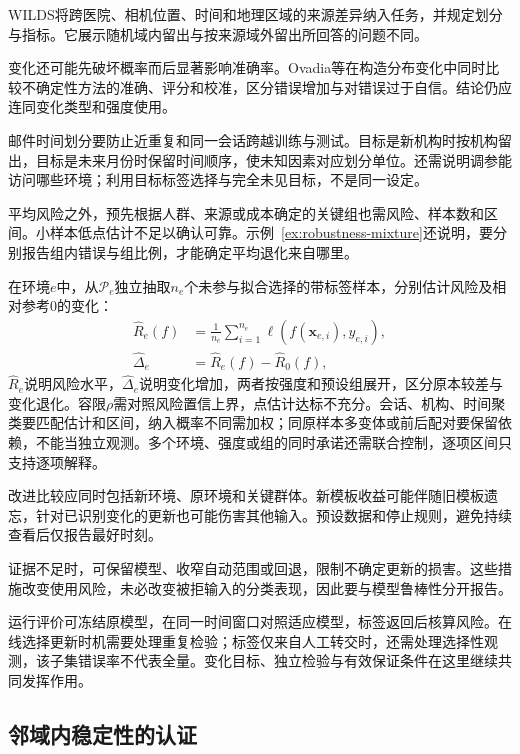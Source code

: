 WILDS将跨医院、相机位置、时间和地理区域的来源差异纳入任务，并规定划分与指标。它展示随机域内留出与按来源域外留出所回答的问题不同。

\Needspace{45mm}
变化还可能先破坏概率而后显著影响准确率。Ovadia等在构造分布变化中同时比较不确定性方法的准确、评分和校准，区分错误增加与对错误过于自信。结论仍应连同变化类型和强度使用。

邮件时间划分要防止近重复和同一会话跨越训练与测试。目标是新机构时按机构留出，目标是未来月份时保留时间顺序，使未知因素对应划分单位。还需说明调参能访问哪些环境；利用目标标签选择与完全未见目标，不是同一设定。

平均风险之外，预先根据人群、来源或成本确定的关键组也需风险、样本数和区间。小样本低点估计不足以确认可靠。示例~\ref{ex:robustness-mixture}还说明，要分别报告组内错误与组比例，才能确定平均退化来自哪里。

在环境$e$中，从$\mathcal P_e$独立抽取$n_e$个未参与拟合选择的带标签样本，分别估计风险及相对参考$0$的变化：
\begin{equation}
 \begin{aligned}
 \widehat R_e(f)&=\frac{1}{n_e}\sum_{i=1}^{n_e}
       \ell(f(\bm{x}_{e,i}),y_{e,i}),\\
 \widehat\Delta_e&=\widehat R_e(f)-\widehat R_0(f),
 \end{aligned}
 \label{eq:robustness-environment-test}
\end{equation}
$\widehat R_e$说明风险水平，$\widehat\Delta_e$说明变化增加，两者按强度和预设组展开，区分原本较差与变化退化。容限$\rho$需对照风险置信上界，点估计达标不充分。会话、机构、时间聚类要匹配估计和区间，纳入概率不同需加权；同原样本多变体或前后配对要保留依赖，不能当独立观测。多个环境、强度或组的同时承诺还需联合控制，逐项区间只支持逐项解释。

改进比较应同时包括新环境、原环境和关键群体。新模板收益可能伴随旧模板遗忘，针对已识别变化的更新也可能伤害其他输入。预设数据和停止规则，避免持续查看后仅报告最好时刻。

证据不足时，可保留模型、收窄自动范围或回退，限制不确定更新的损害。这些措施改变使用风险，未必改变被拒输入的分类表现，因此要与模型鲁棒性分开报告。

运行评价可冻结原模型，在同一时间窗口对照适应模型，标签返回后核算风险。在线选择更新时机需要处理重复检验；标签仅来自人工转交时，还需处理选择性观测，该子集错误率不代表全量。变化目标、独立检验与有效保证条件在这里继续共同发挥作用。

\subsection{邻域内稳定性的认证}
\label{sec:robustness-certification}

